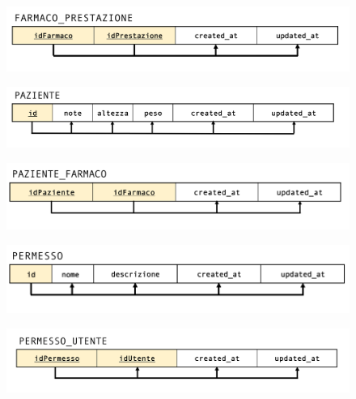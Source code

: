 \documentclass[paper=a4, fontsize=11pt,x11names]{report}
\begin{document}
\begin{figure}[H]
\begin{center}
\includegraphics[scale=0.35]{immagini_normalizzazione/farmaco_prestazione}
\end{center}
\end{figure}

\begin{figure}[H]
\begin{center}
\includegraphics[scale=0.35]{immagini_normalizzazione/paziente}
\end{center}
\end{figure}

\begin{figure}[H]
\begin{center}
\includegraphics[scale=0.35]{immagini_normalizzazione/paziente_farmaco}
\end{center}
\end{figure}

\begin{figure}[H]
\begin{center}
\includegraphics[scale=0.35]{immagini_normalizzazione/permessi}
\end{center}
\end{figure}

\begin{figure}[H]
\begin{center}
\includegraphics[scale=0.35]{immagini_normalizzazione/permessi_utente}
\end{center}
\end{figure}
\end{document}

